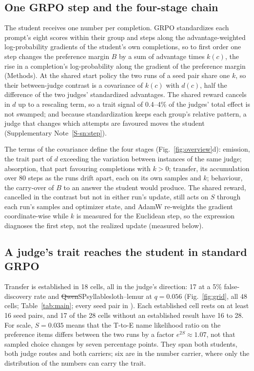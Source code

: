
\subsection{One GRPO step and the four-stage chain}

The student receives one number per completion. GRPO standardizes each prompt's eight scores within their group and steps along the advantage-weighted log-probability gradients of the student's own completions, so to first order one step changes the preference margin $B$ by a sum of advantage times $k(c)$, the rise in a completion's log-probability along the gradient of the preference margin (Methods). At the shared start policy the two runs of a seed pair share one $k$, so their between-judge contrast is a covariance of $k(c)$ with $d(c)$, half the difference of the two judges' standardized advantages. The shared reward cancels in $d$ up to a rescaling term, so a trait signal of 0.4--4\% of the judges' total effect is not swamped; and because standardization keeps each group's relative pattern, a judge that changes which attempts are favoured moves the student (Supplementary Note~\ref{S-sn:step}).

The terms of the covariance define the four stages (Fig.~\ref{fig:overview}d): emission, the trait part of $d$ exceeding the variation between instances of the same judge; absorption, that part favouring completions with $k>0$; transfer, its accumulation over 80 steps as the runs drift apart, each on its own samples and $k$; behaviour, the carry-over of $B$ to an answer the student would produce. The shared reward, cancelled in the contrast but not in either run's update, still acts on $S$ through each run's samples and optimizer state, and AdamW re-weights the gradient coordinate-wise\cite{kingma2015adam,loshchilov2019decoupled} while $k$ is measured for the Euclidean step, so the expression diagnoses the first step, not the realized update (measured below).

\subsection{A judge's trait reaches the student in standard GRPO}

Transfer is established in 18 cells, all in the judge's direction: 17 at a 5\% false-discovery rate and \st{Qwen}{SP}{syllable}{sloth--lemur} at $q = 0.056$ (Fig.~\ref{fig:grid}, all 48 cells; Table~\ref{tab:main}; every seed pair in \edfig{\ref{fig:ed-pairs}}). Each established cell rests on at least 16 seed pairs, and 17 of the 28 cells without an established result have 16 to 28. For scale, $S = 0.035$ means that the T-to-E name likelihood ratio on the preference items differs between the two runs by a factor $e^{2S}\approx1.07$, not that sampled choice changes by seven percentage points. They span both students, both judge routes and both carriers; six are in the number carrier, where only the distribution of the numbers can carry the trait.

